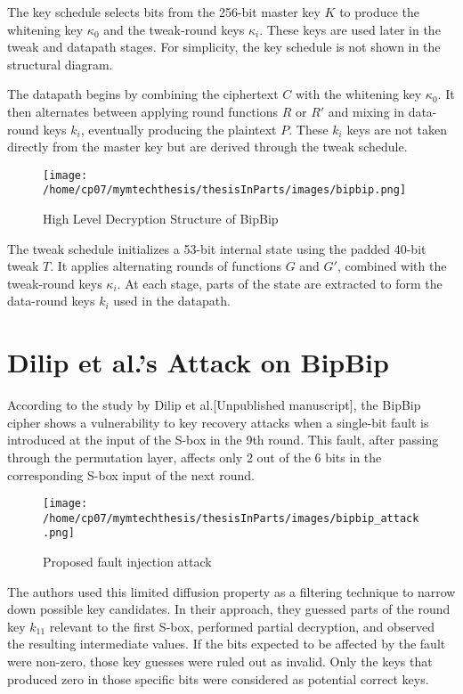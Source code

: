 The key schedule selects bits from the 256-bit master key $K$ to produce the whitening key $\kappa_0$ and the tweak-round keys $\kappa_i$. These keys are used later in the tweak and datapath stages. For simplicity, the key schedule is not shown in the structural diagram.

The datapath begins by combining the ciphertext $C$ with the whitening key $\kappa_0$. It then alternates between applying round functions $R$ or $R'$ and mixing in data-round keys $k_i$, eventually producing the plaintext $P$. These $k_i$ keys are not taken directly from the master key but are derived through the tweak schedule.
\begin{figure}[h]
    \centering
    \texttt{[image: /home/cp07/mymtechthesis/thesisInParts/images/bipbip.png]}
    \caption{High Level Decryption Structure of BipBip}
    \label{fig:bipbip_decrypt_structure}
\end{figure}


The tweak schedule initializes a 53-bit internal state using the padded 40-bit tweak $T$. It applies alternating rounds of functions $G$ and $G'$, combined with the tweak-round keys $\kappa_i$. At each stage, parts of the state are extracted to form the data-round keys $k_i$ used in the datapath.

\section{Dilip et al.'s Attack on BipBip}
According to the study by Dilip et al.[Unpublished manuscript], the BipBip cipher shows a vulnerability to key recovery attacks when a single-bit fault is introduced at the input of the S-box in the 9th round. This fault, after passing through the permutation layer, affects only 2 out of the 6 bits in the corresponding S-box input of the next round. 
\begin{figure}[h]
    \centering
    \texttt{[image: /home/cp07/mymtechthesis/thesisInParts/images/bipbip\_attack.png]}
    \caption{Proposed fault injection attack}
    \label{fig:bipbip_attack}
\end{figure}
The authors used this limited diffusion property as a filtering technique to narrow down possible key candidates.
In their approach, they guessed parts of the round key $k_{11}$ relevant to the first S-box, performed partial decryption, and observed the resulting intermediate values. If the bits expected to be affected by the fault were non-zero, those key guesses were ruled out as invalid. Only the keys that produced zero in those specific bits were considered as potential correct keys.




